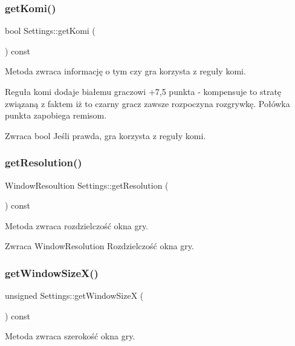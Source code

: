 \subsubsection{getKomi()}
{\footnotesize\ttfamily bool Settings\+::get\+Komi (\begin{DoxyParamCaption}{ }\end{DoxyParamCaption}) const}



Metoda zwraca informację o tym czy gra korzysta z reguły komi. 

Reguła komi dodaje białemu graczowi +7,5 punkta -\/ kompensuje to stratę związaną z faktem iż to czarny gracz zawsze rozpoczyna rozgrywkę. Połówka punkta zapobiega remisom.

\begin{DoxyReturn}{Zwraca}
bool Jeśli prawda, gra korzysta z reguły komi. 
\end{DoxyReturn}
\mbox{\label{class_settings_a69a06d81a9d82bd221d14b7ec7792237}} 
\subsubsection{getResolution()}
{\footnotesize\ttfamily Window\+Resoultion Settings\+::get\+Resolution (\begin{DoxyParamCaption}{ }\end{DoxyParamCaption}) const}



Metoda zwraca rozdzielczość okna gry. 

\begin{DoxyReturn}{Zwraca}
Window\+Resolution Rozdzielczość okna gry. 
\end{DoxyReturn}
\mbox{\label{class_settings_a476be01c9fc7949347c5c6710b2a6d68}} 
\subsubsection{getWindowSizeX()}
{\footnotesize\ttfamily unsigned Settings\+::get\+Window\+SizeX (\begin{DoxyParamCaption}{ }\end{DoxyParamCaption}) const}



Metoda zwraca szerokość okna gry. 

